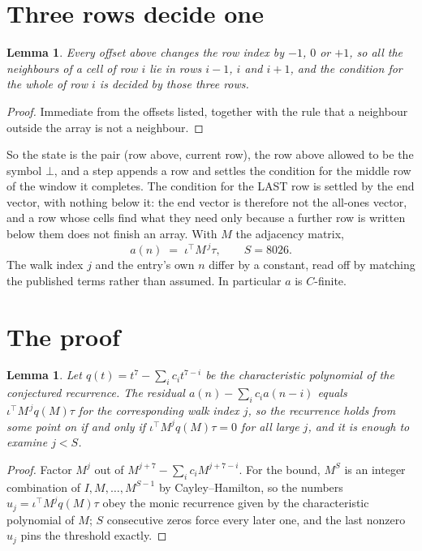 \documentclass[11pt,a4paper]{article}
\theoremstyle{plain}
\newtheorem{lemma}[theorem]{Lemma}
\theoremstyle{definition}
\begin{document}
\section{Three rows decide one}

\begin{lemma}\label{lem:win}
Every offset above changes the row index by $-1$, $0$ or $+1$, so all the neighbours of a cell
of row $i$ lie in rows $i-1$, $i$ and $i+1$, and the condition for the whole of row $i$ is
decided by those three rows.
\end{lemma}

\begin{proof}
Immediate from the offsets listed, together with the rule that a neighbour outside the array is
not a neighbour.
\end{proof}

So the state is the pair (row above, current row), the row above allowed to be the symbol
$\bot$, and a step appends a row and settles the condition for the middle row of the window it
completes. The condition for the LAST row is settled by the end vector, with nothing below it:
the end vector is therefore not the all-ones vector, and a row whose cells find what they need
only because a further row is written below them does not finish an array. With $M$ the
adjacency matrix,
\[
a(n)\;=\;\iota^{\!\top}M^{\,j}\tau ,\qquad S=8026.
\]
The walk index $j$ and the entry's own $n$ differ by a constant, read off by matching the
published terms rather than assumed. In particular $a$ is $C$-finite.

\section{The proof}

\begin{lemma}\label{lem:crit}
Let $q(t)=t^{7}-\sum_i c_it^{7-i}$ be the characteristic polynomial of the
conjectured recurrence. The residual $a(n)-\sum_ic_ia(n-i)$ equals
$\iota^{\!\top}M^{\,j}q(M)\tau$ for the corresponding walk index $j$, so the recurrence
holds from some point on if and only if $\iota^{\!\top}M^{j}q(M)\tau=0$ for all large $j$,
and it is enough to examine $j<S$.
\end{lemma}

\begin{proof}
Factor $M^{j}$ out of $M^{j+7}-\sum_ic_iM^{j+7-i}$. For the bound, $M^{S}$
is an integer combination of $I,M,\dots,M^{S-1}$ by Cayley--Hamilton, so the numbers
$u_j=\iota^{\!\top}M^{j}q(M)\tau$ obey the monic recurrence given by the characteristic
polynomial of $M$; $S$ consecutive zeros force every later one, and the last nonzero $u_j$
pins the threshold exactly.
\end{proof}
\end{document}
